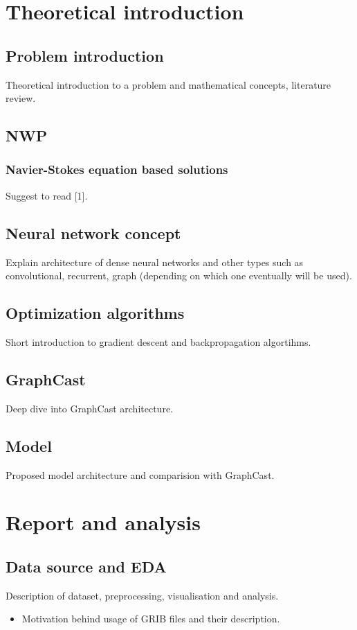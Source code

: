 \documentclass{article}
\begin{document}
	\section{Theoretical introduction}
	
    \subsection{Problem introduction}
	Theoretical introduction to a problem and mathematical concepts, literature review.
    \subsection{NWP}
    \subsubsection{Navier-Stokes equation based solutions}
    Suggest to read [1].
	\subsection{Neural network concept}
	Explain architecture of dense neural networks and other types such as convolutional, recurrent, graph (depending on which one eventually will be used).
	\subsection{Optimization algorithms}
	Short introduction to gradient descent and backpropagation algortihms. 
	\subsection{GraphCast}
	Deep dive into GraphCast architecture.
	\subsection{Model}
	Proposed model architecture and comparision with GraphCast. 
	
    \section{Report and analysis}
	\subsection{Data source and EDA}
	Description of dataset, preprocessing, visualisation and analysis.
        \begin{itemize}
            \item Motivation behind usage of GRIB files and their description.
        \end{itemize}
\end{document}
